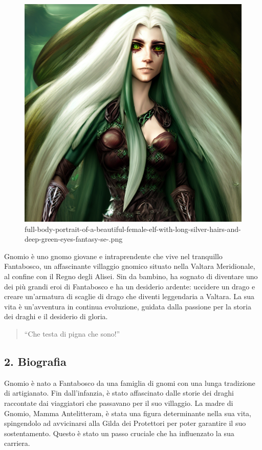 \begin{figure}
\centering
\includegraphics{full-body-portrait-of-a-beautiful-female-elf-with-long-silver-hairs-and-deep-green-eyes-fantasy-se-.png}
\caption{full-body-portrait-of-a-beautiful-female-elf-with-long-silver-hairs-and-deep-green-eyes-fantasy-se-.png}
\end{figure}

Gnomio è uno gnomo giovane e intraprendente che vive nel tranquillo
Fantabosco, un affascinante villaggio gnomico situato nella Valtara
Meridionale, al confine con il Regno degli Alisei. Sin da bambino, ha
sognato di diventare uno dei più grandi eroi di Fantabosco e ha un
desiderio ardente: uccidere un drago e creare un'armatura di scaglie di
drago che diventi leggendaria a Valtara. La sua vita è un'avventura in
continua evoluzione, guidata dalla passione per la storia dei draghi e
il desiderio di gloria.

\begin{quote}
``Che testa di pigna che sono!''
\end{quote}

\subsection{2. Biografia}\label{biografia}


Gnomio è nato a Fantabosco da una famiglia di gnomi con una lunga
tradizione di artigianato. Fin dall'infanzia, è stato affascinato dalle
storie dei draghi raccontate dai viaggiatori che passavano per il suo
villaggio. La madre di Gnomio, Mamma Antelitteram, è stata una figura
determinante nella sua vita, spingendolo ad avvicinarsi alla Gilda dei
Protettori per poter garantire il suo sostentamento. Questo è stato un
passo cruciale che ha influenzato la sua carriera.

